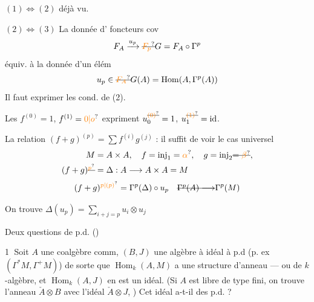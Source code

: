 $(1)\Longleftrightarrow(2)$ déjà vu.

$(2)\Longleftrightarrow(3)$ La donnée d'
foncteurs cov
\[
F_A\xrightarrow{u_p}\deleted{\unsure{F_p}}G=F_A\circ\Gamma^p
\]
équiv. à la donnée d'un élém
\[
u_p\in\deleted{\unsure{F_A}}G(A)=\operatorname{Hom}(A,\Gamma^{p}(A))
\]
Il faut exprimer les cond. de (2).

Les  $f^{(0)}=1$, $f^{(1)}=\unsure{0|o}$ expriment
$u_0^{\deleted{\unsure{(0)}}}=1$, $u_1^{\deleted{\unsure{(1)}}}=\mathrm{id}$.

La relation $(f+g)^{(p)}=\sum f^{(i)}g^{(j)}$ : il
suffit de voir le cas universel
\[
\begin{aligned}
M&=A\times A,\quad f=\mathrm{inj}_{1}=\unsure{\alpha},\quad
g=\mathrm{inj}_{2}\deleted{=\unsure{\beta}},\\
(f+g)\deleted{{}^{\unsure{p}}}&=\Delta:A\longrightarrow A\times A=M
\end{aligned}
\]
\[
(f+g)^{\unsure{p|(p)}}=\Gamma^{p}(\Delta)\circ u_p\quad
\deleted{\Gamma^{p}(A)\longrightarrow}\Gamma^{p}(M)
\]


On trouve $\Delta(u_p)=\displaystyle\sum_{i+j=p}u_i\otimes u_j$


Deux questions de p.d. ()

\textcircled{1} Soit $A$ une coalgèbre  comm,
$(B,J)$ une algèbre à idéal à p.d
(p. ex $(\Gamma^{\ast}M,\Gamma^{+}M)$)
de sorte que $\operatorname{Hom}_k(A,M)$ a une structure
d'anneau --- ou de $k$-algèbre, et
$\operatorname{Hom}_k(A,J)$ en est un idéal. (Si
$A$ est libre de type fini, on trouve
l'anneau $\check A\otimes B$ avec l'idéal $\check A\otimes J$,
) Cet idéal a-t-il
des p.d. ?

